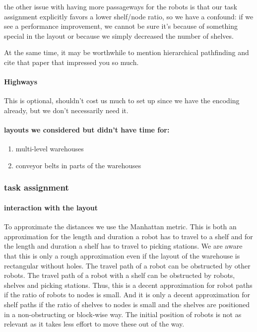 the other issue with having more passageways for the robots is that our task assignment explicitly favors a lower shelf/node ratio, so we have a confound: if we see a performance improvement, we cannot be sure it's because of something special in the layout or because we simply decreased the number of shelves.

At the same time, it may be worthwhile to mention hierarchical pathfinding and cite that paper that impressed you so much.

\paragraph{Highways}
\label{sec:orgf2ba3a1}
This is optional, shouldn't cost us much to set up since we have the encoding already, but we don't necessarily need it.

\paragraph{layouts we considered but didn't have time for:}
\label{sec:org7837de8}
\begin{enumerate}
\item multi-level warehouses
\label{sec:org9d13e8e}
\item conveyor belts in parts of the warehouses
\label{sec:org088bd19}
\end{enumerate}
\subsubsection{task assignment}
\label{sec:org31e6b66}
\paragraph{interaction with the layout}
\label{sec:org66ff033}
To approximate the distances we use the Manhattan metric.
This is both an approximation for the length and duration a robot has to travel to a shelf and for the length and duration a shelf has to travel to picking stations.
We are aware that this is only a rough approximation even if the layout of the warehouse is rectangular without holes.
The travel path of a robot can be obstructed by other robots.
The travel path of a robot with a shelf can be obstructed by robots, shelves and picking stations.
Thus, this is a decent approximation for robot paths if the ratio of robots to nodes is small.
And it is only a decent approximation for shelf paths if the ratio of shelves to nodes is small and the shelves are positioned in a non-obstructing or block-wise way.
The initial position of robots is not as relevant as it takes less effort to move these out of the way.

